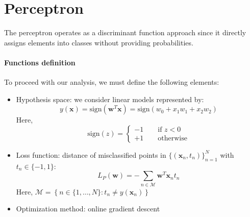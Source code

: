 \section{Perceptron}

The perceptron operates as a discriminant function approach since it directly assigns elements into classes without providing probabilities.
\paragraph*{Functions definition}
To proceed with our analysis, we must define the following elements:
\begin{itemize}
    \item Hypothesis space: we consider linear models represented by:
        \[y(\textbf{x})=\text{sign}(\textbf{w}^T\textbf{x})=\text{sign}(w_0+x_1w_1+x_2w_2)\]
        Here, 
        \[\text{sign}(z)=\begin{cases}
            -1 \qquad\text{if }z<0 \\
            +1 \qquad\text{otherwise}
        \end{cases}\]
    \item Loss function: distance of misclassified points in ${\{(\textbf{x}_n, t_n)\}}^{N}_{n=1}$ with $t_n\in\{-1,1\}$: 
        \[L_P(\textbf{w})=-\sum_{n\in\mathcal{M}}\textbf{w}^T\textbf{x}_n t_n\]
        Here, $\mathcal{M}=\left\{ n\in\{1,\dots,N\}:t_n\neq y(\textbf{x}_n) \right\}$
    \item Optimization method: online gradient descent
\end{itemize}

